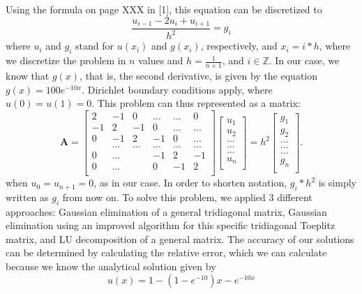 \documentclass[10pt,a4paper]{article}
\begin{document}
Using the formula on page XXX in [1], this equation can be discretized to 
$$\frac{u_{i-1}-2u_{i}+u_{i+1}}{h^2} = g_{i}$$
where $u_{i}$ and $g_{i}$ stand for $u(x_{i})$ and $g(x_{i})$, respectively, and $x_{i}=i*h$, where we discretize the problem in $n$ values and  $h=\frac{1}{n+1}$, and $i  \in  \mathbb{Z}$.
In our case, we know that $g(x)$, that is, the second derivative, is given by the equation $g(x) = 100e^{-10x}$. Dirichlet boundary conditions apply, where $u(0)=u(1)=0$.
This problem can thus represented as a matrix:
\[
    \mathbf{A} = \begin{bmatrix}
                           2& -1& 0 &\dots   & \dots &0 \\
                           -1 & 2 & -1 &0 &\dots &\dots \\
                           0&-1 &2 & -1 & 0 & \dots \\
                           & \dots   & \dots &\dots   &\dots & \dots \\
                           0&\dots   &  &-1 &2& -1 \\
                           0&\dots    &  & 0  &-1 & 2 \\
                      \end{bmatrix}\begin{bmatrix}
                           u_1\\
                           u_2\\
                           \dots \\
                          \dots  \\
                          \dots \\
                           u_n\\
                      \end{bmatrix}
  =h^2
\begin{bmatrix}
                           {g}_1\\
                           {g}_2\\
                           \dots \\
                           \dots \\
                          \dots \\
                           {g}_n\\
                      \end{bmatrix}.
\]
when $u_{0}=u_{n+1}=0$, as in our case. In order to shorten notation, $g_i*h^2$ is simply written as  $g_i$ from now on.
To solve this problem, we applied 3 different approaches: Gaussian elimination of a general tridiagonal matrix, Gaussian elimination using an improved algorithm for this specific tridiagonal Toeplitz matrix, and LU decomposition of a general matrix. The accuracy of our solutions can be determined by calculating the relative error, which we can calculate because we know the analytical solution given by 
$$u(x)=1-(1-e^{-10})x-e^{-10x}$$
\end{document}
